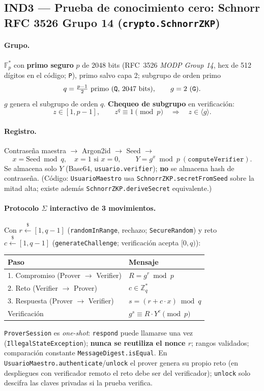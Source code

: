 \documentclass[11pt,a4paper]{article}
\newcommand{\Zq}{\mathbb{Z}_q}
\newcommand{\Fp}{\mathbb{F}_p}
\begin{document}
\subsection{IND3 --- Prueba de conocimiento cero: Schnorr RFC 3526 Grupo 14 (\texttt{crypto.SchnorrZKP})}
\paragraph{Grupo.} $\Fp^*$ con \textbf{primo seguro} $p$ de 2048 bits (RFC~3526
\emph{MODP Group 14}, hex de 512 dígitos en el código; \texttt{P}), primo salvo
capa 2; subgrupo de orden primo
\[
  q = \tfrac{p-1}{2}\ \text{primo (\texttt{Q}, 2047 bits)},\qquad g = 2\ (\texttt{G}).
\]
$g$ genera el subgrupo de orden $q$. \textbf{Chequeo de subgrupo} en verificación:
\[
  z \in [1, p-1],\qquad z^{q} \equiv 1 \pmod p\quad\Rightarrow\quad z \in \langle g\rangle .
\]
\paragraph{Registro.} Contraseña maestra $\to$ Argon2id $\to$ Seed $\to$
\[
  x = \text{Seed} \bmod q,\quad x{=}1 \text{ si } x{=}0,\qquad
  Y = g^{x} \bmod p\ (\texttt{computeVerifier}).
\]
Se almacena solo $Y$ (Base64, \texttt{usuario.verifier}); \textbf{no} se almacena
hash de contraseña. (Código: \texttt{UsuarioMaestro} usa
\texttt{SchnorrZKP.secretFromSeed} sobre la mitad alta; existe además
\texttt{SchnorrZKP.deriveSecret} equivalente.)
\paragraph{Protocolo $\Sigma$ interactivo de 3 movimientos.} Con $r \xleftarrow{\$} [1, q-1]$
(\texttt{randomInRange}, rechazo; \texttt{SecureRandom}) y reto $c \xleftarrow{\$} [1, q-1]$
(\texttt{generateChallenge}; verificación acepta $[0,q)$):
\begin{center}
\begin{tabular}{@{}ll@{}}
\toprule
Paso & Mensaje \\
\midrule
1. Compromiso (Prover $\to$ Verifier) & $R = g^{r} \bmod p$ \\
2. Reto (Verifier $\to$ Prover) & $c \in \Zq^*$ \\
3. Respuesta (Prover $\to$ Verifier) & $s = (r + c\cdot x) \bmod q$ \\
\midrule
Verificación & $g^{s} \equiv R \cdot Y^{c} \pmod p$ \\
\bottomrule
\end{tabular}
\end{center}
\texttt{ProverSession} es \emph{one-shot}: \texttt{respond} puede llamarse una vez
(\texttt{IllegalStateException}); \textbf{nunca se reutiliza el nonce $r$}; rangos
validados; comparación constante \texttt{MessageDigest.isEqual}. En
\texttt{UsuarioMaestro.authenticate}/\texttt{unlock} el prover genera su propio
reto (en despliegues con verificador remoto el reto debe ser del verificador);
\texttt{unlock} solo descifra las claves privadas si la prueba verifica.
\end{document}
